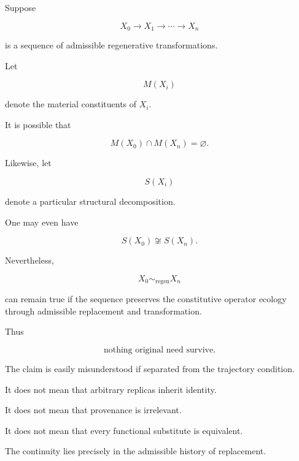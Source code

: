 \documentclass[11pt]{article}
\theoremstyle{remark}
\begin{document}
Suppose

\begin{equation}
X_0
\rightarrow
X_1
\rightarrow
\cdots
\rightarrow
X_n
\end{equation}

is a sequence of admissible regenerative transformations.

Let

\begin{equation}
M(X_i)
\end{equation}

denote the material constituents of $X_i$.

It is possible that

\begin{equation}
M(X_0)\cap M(X_n)=\varnothing.
\end{equation}

Likewise, let

\begin{equation}
S(X_i)
\end{equation}

denote a particular structural decomposition.

One may even have

\begin{equation}
S(X_0)\not\cong S(X_n).
\end{equation}

Nevertheless,

\begin{equation}
X_0\sim_{\mathrm{regen}}X_n
\end{equation}

can remain true if the sequence preserves the constitutive operator ecology through admissible replacement and transformation.

Thus

\begin{equation}
\boxed{
\text{nothing original need survive}.
}
\end{equation}

The claim is easily misunderstood if separated from the trajectory condition.

It does not mean that arbitrary replicas inherit identity.

It does not mean that provenance is irrelevant.

It does not mean that every functional substitute is equivalent.

The continuity lies precisely in the admissible history of replacement.
\end{document}
